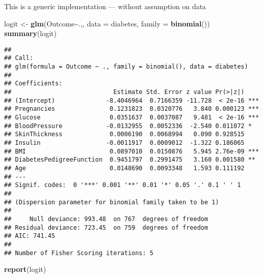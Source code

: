 \documentclass[
]{article}
\newenvironment{Shaded}{\begin{snugshade}}{\end{snugshade}}
\newcommand{\AttributeTok}[1]{\textcolor[rgb]{0.13,0.29,0.53}{#1}}
\newcommand{\FunctionTok}[1]{\textcolor[rgb]{0.13,0.29,0.53}{\textbf{#1}}}
\newcommand{\NormalTok}[1]{#1}
\newcommand{\OtherTok}[1]{\textcolor[rgb]{0.56,0.35,0.01}{#1}}
\newcommand{\SpecialCharTok}[1]{\textcolor[rgb]{0.81,0.36,0.00}{\textbf{#1}}}
\begin{document}
This is a generic implementation --- without assumption on data

\begin{Shaded}
\begin{Highlighting}[]
\NormalTok{logit }\OtherTok{\textless{}{-}} \FunctionTok{glm}\NormalTok{(Outcome}\SpecialCharTok{\textasciitilde{}}\NormalTok{.,, }\AttributeTok{data =}\NormalTok{ diabetes, }\AttributeTok{family =} \FunctionTok{binomial}\NormalTok{())}
\FunctionTok{summary}\NormalTok{(logit)}
\end{Highlighting}
\end{Shaded}

\begin{verbatim}
## 
## Call:
## glm(formula = Outcome ~ ., family = binomial(), data = diabetes)
## 
## Coefficients:
##                            Estimate Std. Error z value Pr(>|z|)    
## (Intercept)              -8.4046964  0.7166359 -11.728  < 2e-16 ***
## Pregnancies               0.1231823  0.0320776   3.840 0.000123 ***
## Glucose                   0.0351637  0.0037087   9.481  < 2e-16 ***
## BloodPressure            -0.0132955  0.0052336  -2.540 0.011072 *  
## SkinThickness             0.0006190  0.0068994   0.090 0.928515    
## Insulin                  -0.0011917  0.0009012  -1.322 0.186065    
## BMI                       0.0897010  0.0150876   5.945 2.76e-09 ***
## DiabetesPedigreeFunction  0.9451797  0.2991475   3.160 0.001580 ** 
## Age                       0.0148690  0.0093348   1.593 0.111192    
## ---
## Signif. codes:  0 '***' 0.001 '**' 0.01 '*' 0.05 '.' 0.1 ' ' 1
## 
## (Dispersion parameter for binomial family taken to be 1)
## 
##     Null deviance: 993.48  on 767  degrees of freedom
## Residual deviance: 723.45  on 759  degrees of freedom
## AIC: 741.45
## 
## Number of Fisher Scoring iterations: 5
\end{verbatim}

\begin{Shaded}
\begin{Highlighting}[]
\FunctionTok{report}\NormalTok{(logit)}
\end{Highlighting}
\end{Shaded}
\end{document}
